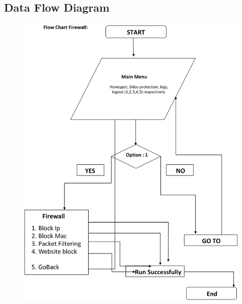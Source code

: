 \documentclass[12pt,a4paper]{report}
\begin{document}
\subsection{Data Flow Diagram}
\begin{figure}
  \includegraphics[width=\linewidth]{1.png}
\end{figure}
\end{document}
